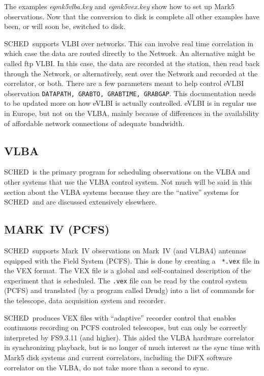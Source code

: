 \documentclass{report}
\newcommand{\schedb}{{\sc SCHED~}}
\begin{document}
The examples {\sl egmk5vlba.key} and {\sl egmk5vex.key} show how to
set up Mark5 observations.  Now that the conversion to disk is complete
all other examples have been, or will soon be, switched to disk.


\schedb supports VLBI over networks.  This can involve real time
correlation in which case the data are routed directly to the Network.
An alternative might be called ftp VLBI.  In this case, the data are
recorded at the station, then read back through the Network, or
alternatively, sent over the Network and recorded at the correlator,
or both.  There are a few parameters meant to help control eVLBI
observation {\tt DATAPATH, GRABTO, GRABTIME, GRABGAP}.  This
documentation needs to be updated more on how eVLBI is actually
controlled.  eVLBI is in regular use in Europe, but not on the VLBA,
mainly because of differences in the availability of affordable network
connections of adequate bandwidth.


\subsection{\label{SSEC:VLBA}VLBA}

\schedb is the primary program for scheduling observations on the VLBA
and other systems that use the VLBA control system.  Not much will be
said in this section about the VLBA systems because they are the
``native'' systems for \schedb and are discussed extensively elsewhere.


\subsection{\label{SSEC:MKIV}MARK~IV (PCFS)}

\schedb supports Mark~IV observations on Mark~IV (and VLBA4) antennas
equipped with the Field System (PCFS). This is done by creating a {\tt
*.vex} file in the VEX format. The VEX file is a global and
self-contained description of the experiment that is scheduled. The
{\tt *.vex} file can be read by the control system (PCFS) and
translated (by a program called {\sc Drudg}) into a list of commands
for the telescope, data acquisition system and recorder.

\schedb produces VEX files with ``adaptive'' recorder control that enables
continuous recording on PCFS controled telescopes, but can only
be correctly interpreted by FS9.3.11 (and higher).  This aided the
VLBA hardware correlator in synchronizing playback, but is no longer
of much interest as the sync time with Mark5 disk systems and current
correlators, including the DiFX software correlator on the VLBA, do not
take more than a second to sync.
\end{document}
